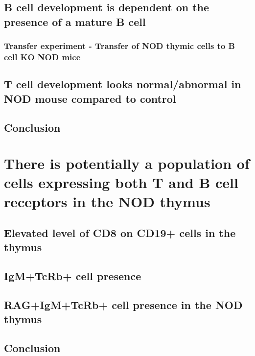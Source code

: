\subsection{B cell development is dependent on the presence of a mature B cell}
\subsubsection{Transfer experiment - Transfer of NOD thymic cells to B cell KO NOD mice}

\subsection{T cell development looks normal/abnormal in NOD mouse compared to control}

\subsection{Conclusion}




\section{There is potentially a population of cells expressing both T and B cell receptors in the NOD thymus}

\subsection{Elevated level of CD8 on CD19+ cells in the thymus}

\subsection{IgM+TcRb+ cell presence}

\subsection{RAG+IgM+TcRb+ cell presence in the NOD thymus}

\subsection{Conclusion}




